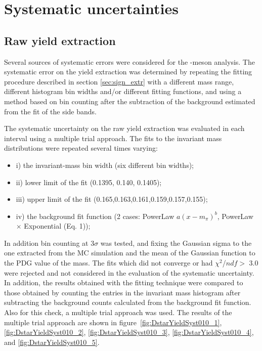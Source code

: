 \clearpage
\section{Systematic uncertainties}

\subsection{Raw yield extraction}
\label{sec:raw_yield_syst}
Several sources of systematic errors were considered for the \Dstar -meson analysis. The systematic error on the yield extraction was determined by repeating the fitting procedure described in section \ref{sec:sign_extr} with a different mass range, different histogram bin widths and/or different fitting functions, and using a method based on bin counting after the subtraction of the background estimated from the fit of the side bands.%

The systematic uncertainty on the raw yield extraction was evaluated in each \pt interval using a multiple trial approach. The fits to the invariant mass distributions were repeated several times varying:
\begin{itemize}
	\item i) the invariant-mass bin width (six different bin widths);
	\item ii) lower limit of the fit (0.1395, 0.140, 0.1405);
	\item iii) upper  limit  of  the  fit (0.165,0.163,0.161,0.159,0.157,0.155);
	\item iv) the background fit function (2 cases: PowerLaw $a(x - m_\pi)^b$, PowerLaw $\times$ Exponential (Eq. 1));
\end{itemize}  

In addition bin counting at 3$\sigma$ was tested, and fixing the Gaussian sigma to the one extracted from the MC simulation and the mean of the Gaussian function to the PDG value of the \Dstar mass. The fits which did not converge or had $\chi^2$/$ndf> $ 3.0 were rejected and not considered in the evaluation of the systematic uncertainty.  In addition, the results obtained with the fitting technique were compared to those obtained by counting the entries in the invariant mass histogram after subtracting the background counts calculated from the background fit function. Also for this check, a multiple trial approach was used. 
The results of the multiple trial approach are shown in figure~\ref{fig:DstarYieldSyst010_1}, \ref{fig:DstarYieldSyst010_2}, \ref{fig:DstarYieldSyst010_3}, \ref{fig:DstarYieldSyst010_4}, and \ref{fig:DstarYieldSyst010_5}. 

